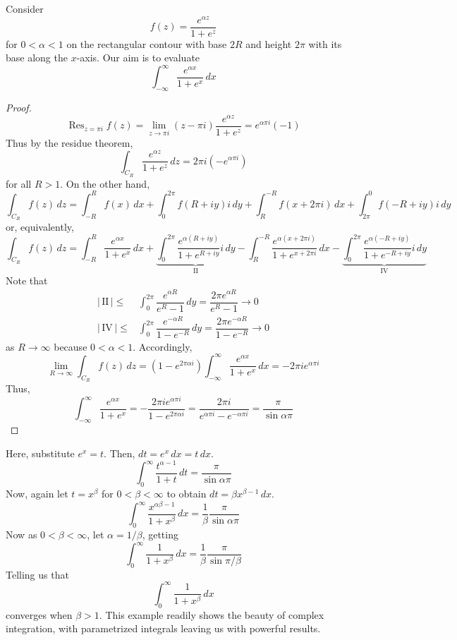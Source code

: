 \vspace{2ex}
\begin{ex}
Consider
\[f(z)=\dfrac{e^{\alpha z}}{1+e^{z}}\]
for $0<\alpha <1$ on the rectangular contour with base $2R$ and height $2\pi $ with its base along the $x$-axis. Our aim is to evaluate 
\[\int ^{\infty }_{-\infty }\dfrac{e^{\alpha x}}{1+e^{x}}\,dx\]
\end{ex}
\vspace{2ex}
\begin{proof}
\[\mathop{\mathrm{Res}}_{z=\pi i}f(z)=\lim _{z\rightarrow \pi i}(z-\pi i)\dfrac{e^{\alpha z}}{1+e^{z}}=e^{\alpha \pi i}(-1)\]
Thus by the residue theorem,
\[\int_{C_{R}}\dfrac{e^{\alpha z}}{1+e^{z}}\,dz=2\pi i(-e^{\alpha \pi i})\]
for all $R>1$. On the other hand, 
\[\int _{C_{R}}f(z)\,dz=\int _{-R}^{R}f(x)\,dx+\int ^{2\pi }_{0}f(R+iy)i\,dy+\int _{R}^{-R}f(x+2\pi i)\,dx+\int ^{0}_{2\pi }f(-R+iy)i\,dy\]
or, equivalently,
\[\int _{C_{R}}f(z)\,dz=\int _{-R}^{R}\dfrac{e^{\alpha x}}{1+e^{x}}\,dx+\underbrace{\int ^{2\pi }_{0}\dfrac{e^{\alpha (R+iy)}}{1+e^{R+iy}}i\,dy}_{\mathrm{II}}-\int _{R}^{-R}\dfrac{e^{\alpha (x+2\pi i)}}{1+e^{x+2\pi i}}\,dx-\underbrace{\int _{0}^{2\pi }\dfrac{e^{\alpha (-R+iy)}}{1+e^{-R+iy}}i\,dy}_{\mathrm{IV}}\]
Note that
\begin{align*}
|\,\mathrm{II}\,|\leq & \int ^{2\pi }_{0}\dfrac{e^{\alpha R}}{e^{R}-1}\,dy=\dfrac{2\pi e^{\alpha R} }{e^{R}-1}\rightarrow 0\\
|\,\mathrm{IV}\,|\leq & \int ^{2\pi }_{0}\dfrac{e^{-\alpha R}}{1-e^{-R}}\,dy=\dfrac{2\pi e^{-\alpha R}}{1-e^{-R}}\rightarrow 0
\end{align*}
as $R\rightarrow \infty $ because $0<\alpha <1$. Accordingly,
\[\lim _{R\rightarrow \infty }\int _{C_{R}}f(z)\,dz=(1-e^{2\pi \alpha i})\int ^{\infty }_{-\infty }\dfrac{e^{\alpha x}}{1+e^{x}}\,dx=-2\pi ie^{\alpha \pi i}\]
Thus,
\[\int _{-\infty }^{\infty }\dfrac{e^{\alpha x}}{1+e^{x}}=-\dfrac{2\pi ie^{\alpha \pi i}}{1-e^{2\pi \alpha i}}=\dfrac{2\pi i}{e^{\alpha \pi i}-e^{-\alpha \pi i}}=\dfrac{\pi }{\sin \alpha \pi }\]
\end{proof}
\vspace{2ex}
\begin{rmk}
Here, substitute $e^{x}=t$. Then, $dt=e^{x}\,dx=t\,dx$. 
\[\int ^{\infty }_{0}\dfrac{t^{\alpha -1}}{1+t}\,dt=\dfrac{\pi }{\sin \alpha \pi }\]
Now, again let $t=x^{\beta }$ for $0<\beta <\infty $ to obtain $dt=\beta x^{\beta -1}\,dx$.
\[\int ^{\infty }_{0}\dfrac{x^{\alpha \beta -1}}{1+x^{\beta }}\,dx=\dfrac{1}{\beta }\dfrac{\pi }{\sin \alpha \pi }\]
Now as $0<\beta <\infty $, let  $\alpha  =1/\beta  $, getting
\[\int ^{\infty }_{0}\dfrac{1}{1+x^{\beta }}\,dx=\dfrac{1}{\beta }\dfrac{\pi }{\sin \pi /\beta }\]
Telling us that 
\[\int ^{\infty }_{0}\dfrac{1}{1+x^{\beta }}\,dx\]
converges when $\beta >1$. This example readily shows the beauty of complex integration, with parametrized integrals leaving us with powerful results. 
\end{rmk}
